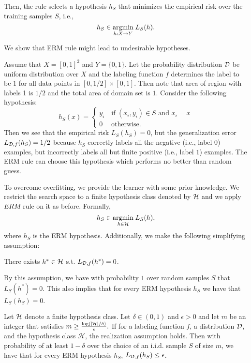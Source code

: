 \documentclass[11pt,a4paper]{article}
\begin{document}
Then, the  rule selects a hypothesis $h_S$ that minimizes the empirical risk over the training samples $S$, i.e.,
\begin{equation*}
h_S \in \underset{h:X\rightarrow Y}{\text{argmin}}\; L_S(h).
\end{equation*}

We show that ERM rule might lead to undesirable hypotheses. 
\begin{remark}
Assume that $X = [0,1]^2$ and $Y = \{0,1\}$. Let the probability distribution $\mathcal{D}$ be uniform distribution over $X$ and the labeling function $f$ determines the label to be $1$ for all data points in $[0,1/2]\times [0,1]$. Then note that area of region with labels 1 is $1/2$ and the total area of domain set is $1$. Consider the following hypothesis:
\begin{equation*}
h_S(x) = 
\begin{cases}
y_i\quad\text{if } (x_i,y_i)\in S\text{ and } x_i = x\\
0  \quad \;\text{otherwise.}
\end{cases}
\end{equation*}
Then we see that the empirical risk $L_S(h_S) = 0$, but the generalization error $L_{\mathcal{D}, f}(h_S) = 1/2$ because $h_S$ correctly labels all the negative (i.e., label $0$) examples, but incorrectly labels all but finite positive (i.e., label $1$) examples. The ERM rule can choose this hypothesis which performs no better than random guess.
\end{remark}

To overcome overfitting, we provide the learner with some prior knowledge. We restrict the search space to a finite hypothesis class denoted by $\mathcal{H}$ and we apply $ERM$ rule on it as before. Formally, 
\begin{equation*}
    h_S \in \underset{h\in \mathcal{H}}{\text{argmin}}\; L_S(h),
\end{equation*}
where $h_S$ is the ERM hypothesis. Additionally, we make the following simplifying assumption:
\begin{assume}
There exists $h^*\in \mathcal{H}$ s.t. $L_{\mathcal{D}, f}(h^*) = 0$.
\end{assume}

By this assumption, we have with probability $1$ over random samples $S$ that $L_S(h^*) = 0$. This also implies that for every ERM hypothesis $h_S$ we have that $L_S(h_S) = 0$.

\begin{prop}
Let $\mathcal{H}$ denote a finite hypothesis class. Let $\delta \in (0,1)$ and $\epsilon >0$ and let $m$ be an integer that satisfies $m\ge \frac{\log(|\mathcal{H}|/\delta)}{\epsilon}.$ If for a labeling function $f$, a distribution $\mathcal{D}$, and the hypothesis class $\mathcal{H}$, the realization assumption holds. Then with probability of at least $1-\delta$ over the choice of an i.i.d. sample $S$ of size $m$, we have that for every ERM hypothesis $h_S$, $L_{\mathcal{D}, f}(h_S)\le \epsilon$.
\end{prop}
\end{document}
